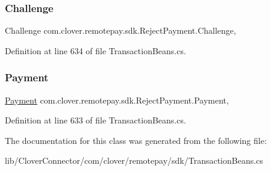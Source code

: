 \subsubsection{\texorpdfstring{Challenge}{Challenge}}
{\footnotesize\ttfamily Challenge com.\+clover.\+remotepay.\+sdk.\+Reject\+Payment.\+Challenge\hspace{0.3cm}{\ttfamily [get]}, {\ttfamily [set]}}



Definition at line 634 of file Transaction\+Beans.\+cs.

\mbox{\label{classcom_1_1clover_1_1remotepay_1_1sdk_1_1_reject_payment_af2f407d26380d55c9c9a53258ab63f3e}} 
\subsubsection{\texorpdfstring{Payment}{Payment}}
{\footnotesize\ttfamily \hyperlink{classcom_1_1clover_1_1sdk_1_1v3_1_1payments_1_1_payment}{Payment} com.\+clover.\+remotepay.\+sdk.\+Reject\+Payment.\+Payment\hspace{0.3cm}{\ttfamily [get]}, {\ttfamily [set]}}



Definition at line 633 of file Transaction\+Beans.\+cs.



The documentation for this class was generated from the following file\+:\begin{DoxyCompactItemize}
\item 
lib/\+Clover\+Connector/com/clover/remotepay/sdk/Transaction\+Beans.\+cs\end{DoxyCompactItemize}

